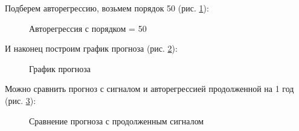 \documentclass[a4paper,oneside,14pt]{extreport}
\begin{document}
Подберем авторегрессию, возьмем порядок 50 (рис. \ref{task3_predict_ar50}):
\begin{figure}[!h]
	\caption{Авторегрессия с порядком = 50}
	\label{task3_predict_ar50}
\end{figure}

\newpage
И наконец построим график прогноза (рис. \ref{task3_predict}):
\begin{figure}[!h]
	\caption{График прогноза}
	\label{task3_predict}
\end{figure}

Можно сравнить прогноз с сигналом и авторегрессией продолженной на 1 год (рис. \ref{task3_predict_compare}):
\begin{figure}[!h]
	\caption{Сравнение прогноза с продолженным сигналом}
	\label{task3_predict_compare}
\end{figure}
\end{document}
